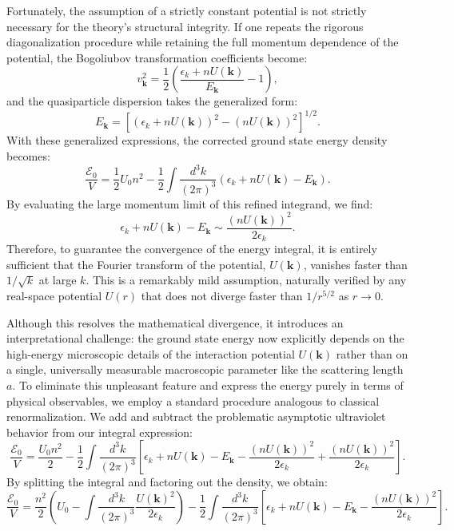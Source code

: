 Fortunately, the assumption of a strictly constant potential is not strictly necessary for the theory's structural integrity. If one repeats the rigorous diagonalization procedure while retaining the full momentum dependence of the potential, the Bogoliubov transformation coefficients become:
\[
    v_{\mathbf{k}}^2 = \frac{1}{2} \left( \frac{\epsilon_k + nU(\mathbf{k})}{E_{\mathbf{k}}} - 1 \right),
\]
and the quasiparticle dispersion takes the generalized form:
\[
    E_{\mathbf{k}} = \left[ (\epsilon_k + nU(\mathbf{k}))^2 - (nU(\mathbf{k}))^2 \right]^{1/2}.
\]
With these generalized expressions, the corrected ground state energy density becomes:
\begin{equation} \label{eq:energy_density_momentum_dependent}
    \frac{\mathcal{E}_0}{V} = \frac{1}{2}U_0 n^2 - \frac{1}{2} \int \frac{d^3k}{(2\pi)^3} (\epsilon_k + nU(\mathbf{k}) - E_{\mathbf{k}}).
\end{equation}
By evaluating the large momentum limit of this refined integrand, we find:
\[
    \epsilon_k + nU(\mathbf{k}) - E_{\mathbf{k}} \sim \frac{(nU(\mathbf{k}))^2}{2\epsilon_k}.
\]
Therefore, to guarantee the convergence of the energy integral, it is entirely sufficient that the Fourier transform of the potential, \( U(\mathbf{k}) \), vanishes faster than \( 1/\sqrt{k} \) at large \( k \). This is a remarkably mild assumption, naturally verified by any real-space potential \( U(r) \) that does not diverge faster than \( 1/r^{5/2} \) as \( r \to 0 \).

Although this resolves the mathematical divergence, it introduces an interpretational challenge: the ground state energy now explicitly depends on the high-energy microscopic details of the interaction potential \( U(\mathbf{k}) \) rather than on a single, universally measurable macroscopic parameter like the scattering length \( a \). To eliminate this unpleasant feature and express the energy purely in terms of physical observables, we employ a standard procedure analogous to classical renormalization. We add and subtract the problematic asymptotic ultraviolet behavior from our integral expression:
\[
    \frac{\mathcal{E}_0}{V} = \frac{U_0 n^2}{2} - \frac{1}{2} \int \frac{d^3k}{(2\pi)^3} \left[ \epsilon_k + nU(\mathbf{k}) - E_{\mathbf{k}} - \frac{(nU(\mathbf{k}))^2}{2\epsilon_k} + \frac{(nU(\mathbf{k}))^2}{2\epsilon_k} \right].
\]
By splitting the integral and factoring out the density, we obtain:
\[
    \frac{\mathcal{E}_0}{V} = \frac{n^2}{2} \left( U_0 - \int \frac{d^3k}{(2\pi)^3} \frac{U(\mathbf{k})^2}{2\epsilon_k} \right) - \frac{1}{2} \int \frac{d^3k}{(2\pi)^3} \left[ \epsilon_k + nU(\mathbf{k}) - E_{\mathbf{k}} - \frac{(nU(\mathbf{k}))^2}{2\epsilon_k} \right].
\]

